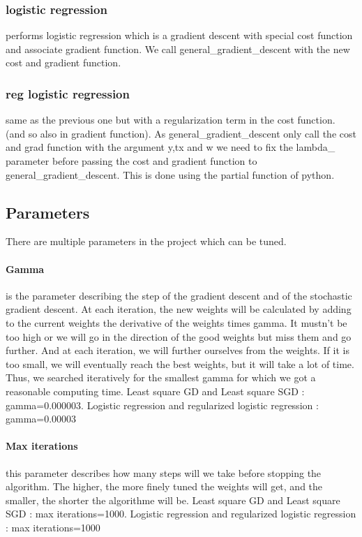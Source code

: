 \documentclass[10pt,conference,compsocconf]{IEEEtran}
\begin{document}
\subsubsection{logistic regression}

performs logistic regression which is a gradient descent with special cost function and associate gradient function. We call general\_gradient\_descent with the new cost and gradient function.

\subsubsection{reg logistic regression}
same as the previous one but with a regularization term in the cost function. (and so also in gradient function). As general\_gradient\_descent only call the cost and grad function with the argument y,tx and w we need to fix the lambda\_ parameter before passing the cost and gradient function to general\_gradient\_descent. This is done using the partial function of python.

\subsection{Parameters}
There are multiple parameters in the project which can be tuned. 
\paragraph{Gamma} is the parameter describing the step of the gradient descent and of the stochastic gradient descent. At each iteration, the new weights will be calculated by adding to the current weights the derivative of the weights times gamma. It mustn’t be too high or we will go in the direction of the good weights but miss them and go further. And at each iteration, we will further ourselves from the weights. If it is too small, we will eventually reach the best weights, but it will take a lot of time. Thus, we searched iteratively for the smallest gamma for which we got a reasonable computing time.
Least square GD and Least square SGD : gamma=0.000003.
Logistic regression and regularized logistic regression : gamma=0.00003
\paragraph{Max iterations} this parameter describes how many steps will we take before stopping the algorithm. The higher, the more finely tuned the weights will get, and the smaller, the shorter the algorithme will be. 
Least square GD and Least square SGD : max iterations=1000.
Logistic regression and regularized logistic regression :  max iterations=1000
\end{document}
